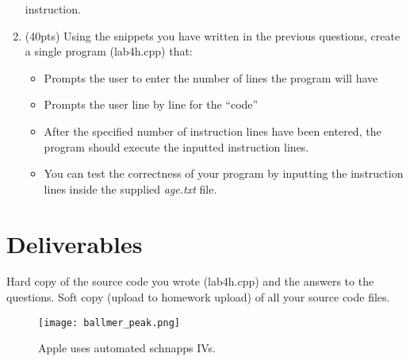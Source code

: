 \documentclass[letterpaper,12pt]{article}
\begin{document}
\begin{enumerate}
                   instruction.
    \item (40pts) Using the snippets you have written in the previous questions,
                  create a single program (lab4h.cpp) that:
                  \begin{itemize}
                      \item Prompts the user to enter the number of lines the program will have
                      \item Prompts the user line by line for the “code”
                      \item After the specified number of instruction lines have been entered,
                            the program should execute the inputted instruction lines.
                      \item You can test the correctness of your program by inputting the instruction
                          lines inside the supplied \emph{age.txt} file.
                  \end{itemize}

\end{enumerate}
\section*{Deliverables}
Hard copy of the source code you wrote (lab4h.cpp)
and the answers to the questions. Soft copy (upload to homework upload) of all your source code files.

\begin{figure}[ht!]
	\centering
	\texttt{[image: ballmer\_peak.png]}
    \caption*{Apple uses automated schnapps IVs.}
\end{figure}
\end{document}
